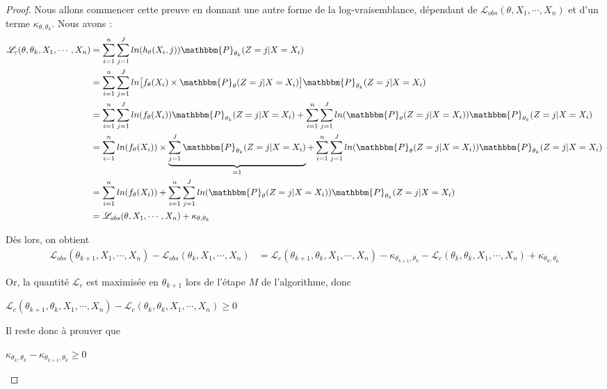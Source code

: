 \documentclass[frenchb]{report}
\newcommand{\1}{\mathbbm{1}}
\newcommand{\prob}{\mathbbm{P}}
\newcommand{\lv}{\mathcal{L}}
\theoremstyle{definition}\newtheorem{defn}{Définition}
\theoremstyle{definition}\newtheorem{exm}{Exemple}
\theoremstyle{definition}\newtheorem{nota}{Notation}
\theoremstyle{definition}\newtheorem{rem}{Remarque}
\begin{document}
\begin{proof}

Nous allons commencer cette preuve en donnant une autre forme de la log-vraisemblance, dépendant de $\lv_ {obs}(\theta, X_1, \cdots, X_n)$ et d'un terme $\kappa_{\theta,\theta_k}$. Nous avons :
\begin{align*}
\lv_c(\theta, \theta_k, X_1, \cdots, X_n) &=  \displaystyle\sum_{i=1}^n\sum_{j=1}^J ln(h_\theta(X_i ,j))  \prob_{\theta_k}(Z = j|X = X_i)\\
&=  \displaystyle\sum_{i=1}^n\sum_{j=1}^J ln\big[f_\theta(X_i)\times \prob_\theta(Z = j|X=X_i)\big]\prob_{\theta_k}(Z = j|X = X_i)\\
&=  \displaystyle\sum_{i=1}^n\sum_{j=1}^J ln(f_\theta(X_i))\prob_{\theta_k}(Z = j|X = X_i) + \sum_{i=1}^n\sum_{j=1}^J ln(\prob_\theta(Z = j|X=X_i))\prob_{\theta_k}(Z = j|X = X_i)\\
&= \displaystyle\sum_{i=1}^n ln(f_\theta(X_i))\times\underbrace{\sum_{j=1}^J \prob_{\theta_k}(Z = j|X = X_i)}_{=1} + \sum_{i=1}^n\sum_{j=1}^J ln(\prob_\theta(Z = j|X = X_i))\prob_{\theta_k}(Z = j|X = X_i)\\
&= \displaystyle\sum_{i=1}^n ln(f_\theta(X_i)) + \sum_{i=1}^n\sum_{j=1}^J ln(\prob_\theta(Z = j|X=X_i))\prob_{\theta_k}(Z = j|X = X_i) \\
&= \lv_{obs}(\theta, X_1, \cdots, X_n) + \kappa_{\theta,\theta_k}
\end{align*}

Dès lors, on obtient
\begin{align*}
\lv_{obs}(\theta_{k+1}, X_1, \cdots, X_n) - \lv_{obs}(\theta_k, X_1, \cdots, X_n) &= \lv_c(\theta_{k+1}, \theta_k, X_1, \cdots, X_n) - \kappa_{\theta_{k+1}, \theta_k} -  \lv_c(\theta_k, \theta_k, X_1, \cdots, X_n) + \kappa_{\theta_{k}, \theta_k}
\end{align*}

Or, la quantité $\lv_c$ est maximisée en $\theta_{k+1}$ lors de l'étape $M$ de l'algorithme, donc
\begin{center} $ \lv_c(\theta_{k+1}, \theta_k, X_1, \cdots, X_n) - \lv_c(\theta_k, \theta_k, X_1, \cdots, X_n) \geq 0$ \end{center}

Il reste donc à prouver que 
\begin{center} $\kappa_{\theta_{k}, \theta_k}-\kappa_{\theta_{k+1}, \theta_k} \geq 0$ \end{center}


\end{proof}
\end{document}
